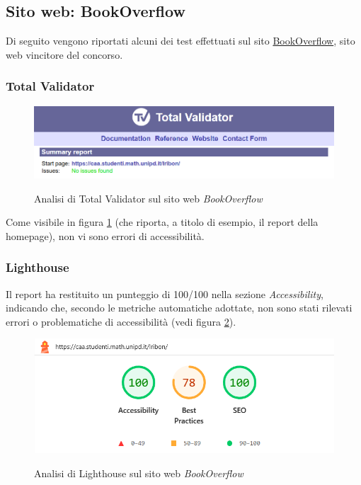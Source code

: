 \subsection{Sito web: BookOverflow}
\noindent Di seguito vengono riportati alcuni dei test effettuati sul sito \href{https://caa.studenti.math.unipd.it/lribon/}{BookOverflow}, sito web vincitore del concorso.
\subsubsection{Total Validator}
\begin{figure}[H]
    \centering
    \includegraphics[width=0.8\linewidth, alt={Screenshot dell'analisi di Total Validator sul sito web BookOverflow}]{img/TV_bookoverflow.png}
    \caption{Analisi di Total Validator sul sito web \textit{BookOverflow}}\label{fig:TV_bookoverflow}
\end{figure}

\noindent Come visibile in figura \ref{fig:TV_bookoverflow} (che riporta, a titolo di esempio, il report della homepage), non vi sono errori di accessibilità.

\subsubsection{Lighthouse}
\noindent Il report ha restituito un punteggio di 100/100 nella sezione \textit{Accessibility}, indicando che, secondo le metriche automatiche adottate, non sono stati rilevati errori o problematiche di accessibilità (vedi figura \ref{fig:Lighthouse_bookoverflow}).
\begin{figure}[H]
    \centering
    \includegraphics[width=0.6\linewidth, alt={Screenshot dell'analisi di Lighthouse sul sito web BookOverflow}]{img/Lighthouse_bookoverflow.png}
    \caption{Analisi di Lighthouse sul sito web \textit{BookOverflow}}\label{fig:Lighthouse_bookoverflow}
\end{figure}

